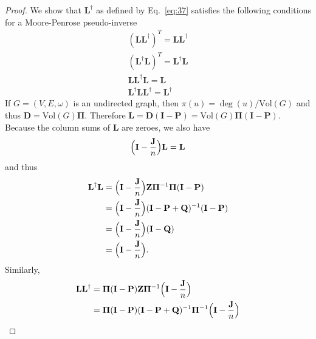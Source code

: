 \begin{proof}
  We show that $\mathbf{L}^{\dagger}$ as defined by Eq.~\eqref{eq:37}
  satisfies the following conditions for a Moore-Penrose pseudo-inverse
  \begin{gather*}
    (\mathbf{L}\mathbf{L}^{\dagger})^{T} =
    \mathbf{L}\mathbf{L}^{\dagger} \tag{i} \\
    (\mathbf{L}^{\dagger}\mathbf{L})^{T} =
    \mathbf{L}^{\dagger}\mathbf{L} \tag{ii} \\
    \mathbf{L}\mathbf{L}^{\dagger}\mathbf{L} = \mathbf{L} \tag{iii} \\
    \mathbf{L}^{\dagger}\mathbf{L} \mathbf{L}^{\dagger} = \mathbf{L}^{\dagger}
    \tag{iv}
  \end{gather*}
  If $G = (V,E,\omega)$ is an undirected graph, then $\pi(u) =
  \deg(u)/\mathrm{Vol}(G)$ and thus $\mathbf{D} = \mathrm{Vol}(G)
  \bm{\Pi}$. Therefore $\mathbf{L} = \mathbf{D}(\mathbf{I} - \mathbf{P}) =
  \mathrm{Vol}(G) \bm{\Pi}(\mathbf{I} - \mathbf{P})$. Because the
  column sums of $\mathbf{L}$ are zeroes, we also have 
  \begin{equation}
    \label{eq:38}
    \Bigl(\mathbf{I} - \frac{\mathbf{J}}{n}\Bigr)\mathbf{L} = \mathbf{L}
  \end{equation}
  and thus
  \begin{equation}
    \label{eq:39}
    \begin{split}
      \mathbf{L}^{\dagger}\mathbf{L} &= \Bigl(\mathbf{I} -
      \frac{\mathbf{J}}{n}\Bigr) \mathbf{Z}
      \bm{\Pi}^{-1} \bm{\Pi}(\mathbf{I} - \mathbf{P}) \\
      &= \Bigl(\mathbf{I} - \frac{\mathbf{J}}{n}\Bigr) (\mathbf{I} -
      \mathbf{P} + \mathbf{Q})^{-1}
      (\mathbf{I} - \mathbf{P}) \\
      &= \Bigl(\mathbf{I} - \frac{\mathbf{J}}{n}\Bigr)(\mathbf{I} - \mathbf{Q}) \\
      &= \Bigl(\mathbf{I} - \frac{\mathbf{J}}{n}\Bigr).
   \end{split}
  \end{equation}
  Similarly,
  \begin{equation}
    \label{eq:40}
    \begin{split}
      \mathbf{L}\mathbf{L}^{\dagger} &= \bm{\Pi}(\mathbf{I} -
      \mathbf{P}) \mathbf{Z}
      \bm{\Pi}^{-1} \Bigl(\mathbf{I} - \frac{\mathbf{J}}{n}\Bigr) \\
      &= \bm{\Pi}(\mathbf{I} - \mathbf{P}) (\mathbf{I} - \mathbf{P} +
      \mathbf{Q})^{-1}
      \bm{\Pi}^{-1} \Bigl(\mathbf{I} - \frac{\mathbf{J}}{n}\Bigr) \\

\end{split}
\end{equation}
\end{proof}
